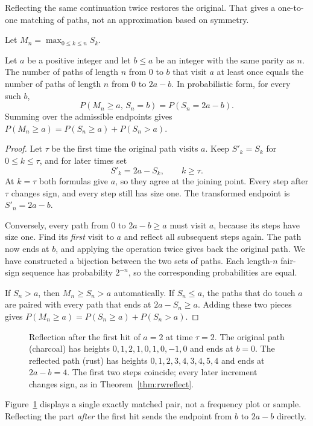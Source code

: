 Reflecting the same continuation twice restores the original. That gives a one-to-one matching of paths, not an approximation based on symmetry.

Let $M_n=\max_{0\le k\le n}S_k$.

\begin{theorem}[reflection]\label{thm:rwreflect}
Let $a$ be a positive integer and let $b\le a$ be an integer with the same parity as $n$. The number of paths of length $n$ from $0$ to $b$ that visit $a$ at least once equals the number of paths of length $n$ from $0$ to $2a-b$. In probabilistic form, for every such $b$,
\[
 P(M_n\ge a,\,S_n=b)=P(S_n=2a-b).
\]
Summing over the admissible endpoints gives $P(M_n\ge a)=P(S_n\ge a)+P(S_n>a)$.
\end{theorem}
\begin{proof}
Let $\tau$ be the first time the original path visits $a$. Keep $S'_k=S_k$ for $0\le k\le\tau$, and for later times set
\[
 S'_k=2a-S_k,\qquad k\ge\tau.
\]
At $k=\tau$ both formulas give $a$, so they agree at the joining point. Every step after $\tau$ changes sign, and every step still has size one. The transformed endpoint is $S'_n=2a-b$.

Conversely, every path from $0$ to $2a-b\ge a$ must visit $a$, because its steps have size one. Find its \emph{first} visit to $a$ and reflect all subsequent steps again. The path now ends at $b$, and applying the operation twice gives back the original path. We have constructed a bijection between the two sets of paths. Each length-$n$ fair-sign sequence has probability $2^{-n}$, so the corresponding probabilities are equal.

If $S_n>a$, then $M_n\ge S_n>a$ automatically. If $S_n\le a$, the paths that do touch $a$ are paired with every path that ends at $2a-S_n\ge a$. Adding these two pieces gives $P(M_n\ge a)=P(S_n\ge a)+P(S_n>a)$.
\end{proof}

\begin{figure}[ht]
\centering
{}
\caption{Reflection after the first hit of $a=2$ at time $\tau=2$. The original path (charcoal) has heights $0,1,2,1,0,1,0,-1,0$ and ends at $b=0$. The reflected path (rust) has heights $0,1,2,3,4,3,4,5,4$ and ends at $2a-b=4$. The first two steps coincide; every later increment changes sign, as in Theorem~\ref{thm:rwreflect}.}
\label{fig:reflectstep}
\end{figure}

Figure~\ref{fig:reflectstep} displays a single exactly matched pair, not a frequency plot or sample. Reflecting the part \emph{after} the first hit sends the endpoint from $b$ to $2a-b$ directly.

